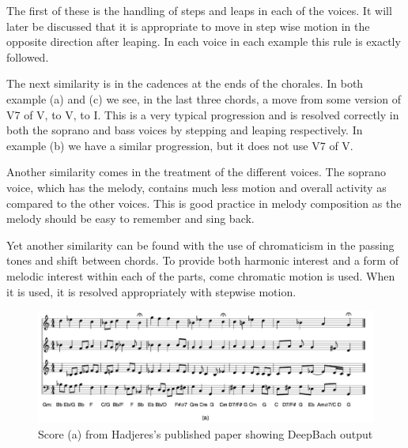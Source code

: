 \vspace{\baselineskip}

The first of these is the handling of steps and leaps in each of the voices.  It will later be discussed that it is appropriate to move in step wise motion in the opposite direction after leaping.  In each voice in each example this rule is exactly followed.

\vspace{\baselineskip}

The next similarity is in the cadences at the ends of the chorales.  In both example (a) and (c) we see, in the last three chords, a move from some version of V7 of V, to V, to I.  This is a very typical progression and is resolved correctly in both the soprano and bass voices by stepping and leaping respectively.  In example (b) we have a similar progression, but it does not use V7 of V.

\vspace{\baselineskip}

Another similarity comes in the treatment of the different voices.  The soprano voice, which has the melody, contains much less motion and overall activity as compared to the other voices.  This is good practice in melody composition as the melody should be easy to remember and sing back.

\vspace{\baselineskip}

Yet another similarity can be found with the use of chromaticism in the passing tones and shift between chords.  To provide both harmonic interest and a form of melodic interest within each of the parts, come chromatic motion is used.  When it is used, it is resolved appropriately with stepwise motion.

\pagebreak

\begin{figure}[!htbp]
	\centering
	\caption{Score (a) from Hadjeres's published paper showing DeepBach output \cite{Hadjeres_2016}}
	\includegraphics[scale=0.3]{images/deepbachOutputA.png}
\end{figure}

